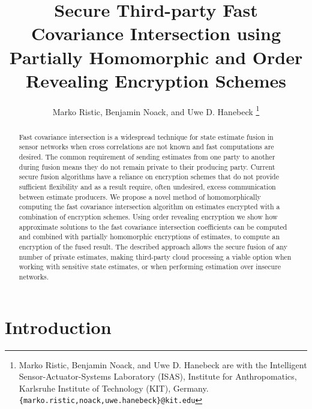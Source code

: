 \documentclass[letterpaper, 10 pt, conference]{ieeeconf}  %
\title{\LARGE \bf
Secure Third-party Fast Covariance Intersection using Partially Homomorphic and Order Revealing Encryption Schemes
}
\author{Marko Ristic, Benjamin Noack, and Uwe D. Hanebeck%
\thanks{Marko Ristic, Benjamin Noack, and Uwe D. Hanebeck are with the Intelligent Sensor-Actuator-Systems Laboratory (ISAS), Institute for Anthropomatics, Karlsruhe Institute of Technology (KIT), Germany.\newline
{\tt\small \{marko.ristic,noack,uwe.hanebeck\}@kit.edu}%
}%
}
\begin{document}
\maketitle
\thispagestyle{empty}
\pagestyle{empty}




\begin{abstract}

Fast covariance intersection is a widespread technique for state estimate fusion in sensor networks when cross correlations are not known and fast computations are desired. The common requirement of sending estimates from one party to another during fusion means they do not remain private to their producing party. Current secure fusion algorithms have a reliance on encryption schemes that do not provide sufficient flexibility and as a result require, often undesired, excess communication between estimate producers. We propose a novel method of homomorphically computing the fast covariance intersection algorithm on estimates encrypted with a combination of encryption schemes. Using order revealing encryption we show how approximate solutions to the fast covariance intersection coefficients can be computed and combined with partially homomorphic encryptions of estimates, to compute an encryption of the fused result. The described approach allows the secure fusion of any number of private estimates, making third-party cloud processing a viable option when working with sensitive state estimates, or when performing estimation over insecure networks.

\end{abstract}



\section{Introduction}
\end{document}
